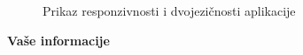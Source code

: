 \documentclass[times, utf8, zavrsni, numeric]{fer}
\begin{document}
    \begin{figure} [H]
      \centering
      \caption{Prikaz responzivnosti i dvojezičnosti aplikacije}
    \end{figure}
    
    
    
    \noindent\textbf{Vaše informacije}
    
\end{document}
